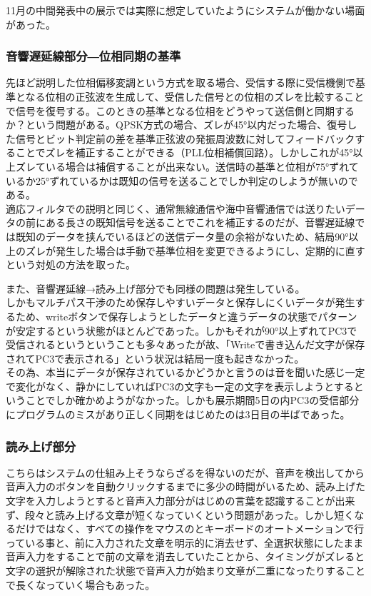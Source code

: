 \documentclass[a4paper,report]{jsbook}
\begin{document}
11月の中間発表中の展示では実際に想定していたようにシステムが働かない場面があった。

\subsubsection{音響遅延線部分―位相同期の基準}\label{ux97f3ux97ffux9045ux5ef6ux7ddaux90e8ux5206ux4f4dux76f8ux540cux671fux306eux57faux6e96}

先ほど説明した位相偏移変調という方式を取る場合、受信する際に受信機側で基準となる位相の正弦波を生成して、受信した信号との位相のズレを比較することで信号を復号する。このときの基準となる位相をどうやって送信側と同期するか？という問題がある。QPSK方式の場合、ズレが45°以内だった場合、復号した信号とビット判定前の差を基準正弦波の発振周波数に対してフィードバックすることでズレを補正することができる（PLL位相補償回路）。しかしこれが45°以上ズレている場合は補償することが出来ない。送信時の基準と位相が75°ずれているか25°ずれているかは既知の信号を送ることでしか判定のしようが無いのである。\\
適応フィルタでの説明と同じく、通常無線通信や海中音響通信では送りたいデータの前にある長さの既知信号を送ることでこれを補正するのだが、音響遅延線では既知のデータを挟んでいるほどの送信データ量の余裕がないため、結局90°以上のズレが発生した場合は手動で基準位相を変更できるようにし、定期的に直すという対処の方法を取った。

また、音響遅延線→読み上げ部分でも同様の問題は発生している。\\
しかもマルチパス干渉のため保存しやすいデータと保存しにくいデータが発生するため、writeボタンで保存しようとしたデータと違うデータの状態でパターンが安定するという状態がほとんどであった。しかもそれが90°以上ずれてPC3で受信されるというということも多々あったが故、「Writeで書き込んだ文字が保存されてPC3で表示される」という状況は結局一度も起きなかった。\\
その為、本当にデータが保存されているかどうかと言うのは音を聞いた感じ一定で変化がなく、静かにしていればPC3の文字も一定の文字を表示しようとするということでしか確かめようがなかった。しかも展示期間5日の内PC3の受信部分にプログラムのミスがあり正しく同期をはじめたのは3日目の半ばであった。

\subsubsection{読み上げ部分}\label{ux8aadux307fux4e0aux3052ux90e8ux5206}

こちらはシステムの仕組み上そうならざるを得ないのだが、音声を検出してから音声入力のボタンを自動クリックするまでに多少の時間がいるため、読み上げた文字を入力しようとすると音声入力部分がはじめの言葉を認識することが出来ず、段々と読み上げる文章が短くなっていくという問題があった。しかし短くなるだけではなく、すべての操作をマウスのとキーボードのオートメーションで行っている事と、前に入力された文章を明示的に消去せず、全選択状態にしたまま音声入力をすることで前の文章を消去していたことから、タイミングがズレると文字の選択が解除された状態で音声入力が始まり文章が二重になったりすることで長くなっていく場合もあった。
\end{document}
